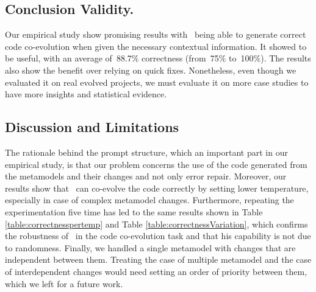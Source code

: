 \subsection{Conclusion Validity.}

Our empirical study show promising results with \LLM~being able to generate correct code co-evolution when given the necessary contextual information. It showed to be useful, with an average of~88.7\% correctness (from~75\% to~100\%). The results also show the benefit over relying on quick fixes. Nonetheless, even though we evaluated it on real evolved projects, we must evaluate it on more case studies to have more insights and statistical evidence.  %

\subsection{Discussion and Limitations}
The rationale behind the prompt structure, which an important part in our empirical study, is that our problem concerns the use of the code generated from the metamodels and their changes and not only error repair. Moreover, our results show that \LLM~can co-evolve the code correctly by setting lower temperature, especially in case of complex metamodel changes. Furthermore, repeating the experimentation five time has led to the same results shown in Table \ref{table:correctnesspertemp} and Table \ref{table:correctnessVariation}, which confirms the robustness of \LLM~in the code co-evolution task and that his capability is not due to randomness.
Finally, we handled a single metamodel with changes that are independent between them. Treating the case of multiple metamodel and the case of interdependent changes would need setting an order of priority between them, which we left for a future work.



